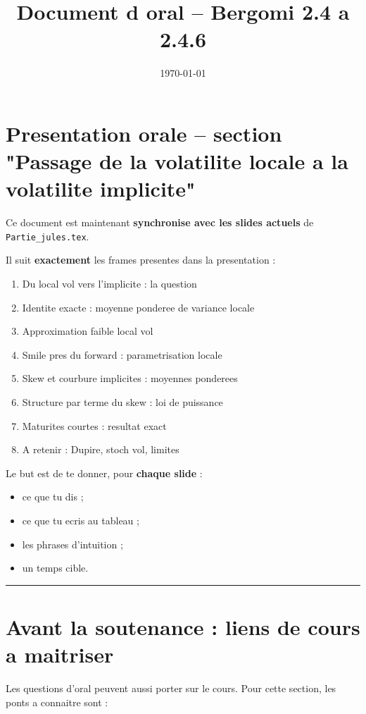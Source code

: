 \documentclass[11pt,a4paper]{article}
\title{Document d oral -- Bergomi 2.4 a 2.4.6}
\author{}
\date{\today}
\begin{document}
\maketitle
\tableofcontents
\newpage
\section{Presentation orale -- section "Passage de la volatilite locale a la volatilite implicite"}

Ce document est maintenant \textbf{synchronise avec les slides actuels} de \texttt{Partie\_jules.tex}.

Il suit \textbf{exactement} les frames presentes dans la presentation :

\begin{enumerate}
\item Du local vol vers l'implicite : la question
\item Identite exacte : moyenne ponderee de variance locale
\item Approximation faible local vol
\item Smile pres du forward : parametrisation locale
\item Skew et courbure implicites : moyennes ponderees
\item Structure par terme du skew : loi de puissance
\item Maturites courtes : resultat exact
\item A retenir : Dupire, stoch vol, limites
\end{enumerate}

Le but est de te donner, pour \textbf{chaque slide} :

\begin{itemize}
\item ce que tu dis ;
\item ce que tu ecris au tableau ;
\item les phrases d'intuition ;
\item un temps cible.
\end{itemize}

\bigskip\hrule\bigskip

\section{Avant la soutenance : liens de cours a maitriser}

Les questions d'oral peuvent aussi porter sur le cours. Pour cette section, les ponts a connaitre sont :
\end{document}
